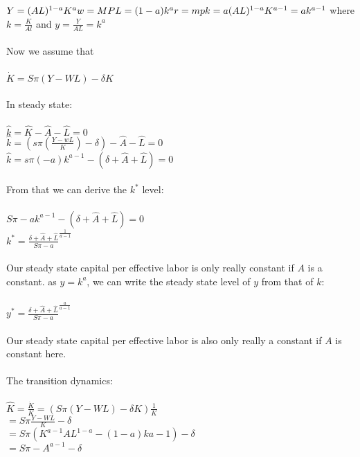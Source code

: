 \documentclass[10pnt]{article}
\begin{document}
	\\
	\\
	$ Y=(AL)^{1-a}K^a
	\\
	w=MPL=(1-a)k^a 
	\\
	r=mpk=a(AL)^{1-a}K^{a-1}=ak^{a-1}
	\\
	$ where $ k = \frac{K}{Al} $ and $y=\frac{Y}{AL}= k^a$
	\\
	\\
	Now we assume that 
	\\
	\\
	$ \dot{K}= S\pi(Y-WL)-\delta{K} $ 
	\\
	\\
	In steady state:
	\\
	\\
	$\widehat{k}=\widehat{K}-\widehat{A}-\widehat{L}= 0 $ 
	\\
	$\widehat{k}= (s\pi(\frac{Y-wL}{K})-\delta)-\widehat{A}-\widehat{L} = 0
	$
	\\
	$\widehat{k}= s\pi(-a)k^{a-1}-(\delta+\widehat{A}+\widehat{L})=0 $
	\\
	\\
	From that we can derive the $k^*$ level:
	\\
	\\
	$S\pi-ak^{a-1}-(\delta+\widehat{A}+\widehat{L}) = 0 $
	\\
	$ k^*= \frac{\delta+\widehat{A}+\widehat{L}}{S\pi-a}^\frac{1}{a-1}
	$
	\\
	\\
	Our steady state capital per effective labor is only really constant if $A$ is a constant.
	as $y=k^a$, we can write the steady state level of $y$ from that of $k$:
	\\
	\\
	$ y^*= \frac{\delta+\widehat{A}+\widehat{L}}{S\pi-a}^\frac{a}{a-1}
	$
	\\
	\\
	Our steady state capital per effective labor is also only really a constant if $A$ is constant here. 
	\\
	\\
	The transition dynamics:
	\\
	\\
	$ \widehat{K}= \frac{\dot{K}}{K}= (S\pi(Y-WL)-\delta{K})\frac{1}{K}$
	\\
	$=S\pi \frac{Y-WL}{K}-\delta$
	\\
	$=S\pi(K^{a-1}AL^{1-a}- (1-a)k{a-1})-\delta$
	\\	
	$=S\pi-A^{a-1}-\delta$
	\\
\end{document}
